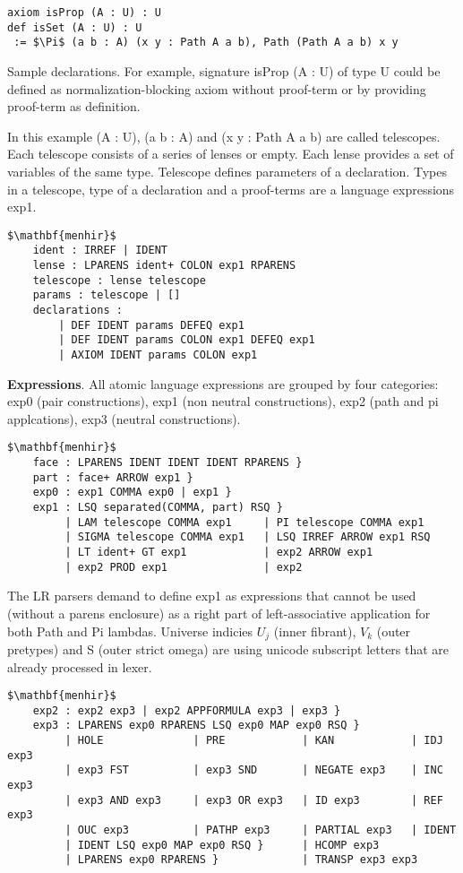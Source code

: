 \documentclass{article}
\begin{document}
\begin{lstlisting}[mathescape=true]
axiom isProp (A : U) : U
def isSet (A : U) : U
 := $\Pi$ (a b : A) (x y : Path A a b), Path (Path A a b) x y
\end{lstlisting}

Sample declarations. For example, signature isProp (A : U) of type U could be
defined as normalization-blocking axiom without proof-term or by providing proof-term as definition.

In this example (A : U), (a b : A) and (x y : Path A a b) are called telescopes.
Each telescope consists of a series of lenses or empty. Each lense provides a
set of variables of the same type. Telescope defines parameters of a declaration.
Types in a telescope, type of a declaration and a proof-terms are a language expressions exp1.

\begin{lstlisting}[mathescape=true]
$\mathbf{menhir}$
    ident : IRREF | IDENT
    lense : LPARENS ident+ COLON exp1 RPARENS
    telescope : lense telescope
    params : telescope | []
    declarations :
        | DEF IDENT params DEFEQ exp1
        | DEF IDENT params COLON exp1 DEFEQ exp1
        | AXIOM IDENT params COLON exp1
\end{lstlisting}

\textbf{Expressions}. All atomic language expressions are grouped by four categories:
exp0 (pair constructions), exp1 (non neutral constructions), exp2 (path and pi applcations),
exp3 (neutral constructions).

\begin{lstlisting}[mathescape=true]
$\mathbf{menhir}$
    face : LPARENS IDENT IDENT IDENT RPARENS }
    part : face+ ARROW exp1 }
    exp0 : exp1 COMMA exp0 | exp1 }
    exp1 : LSQ separated(COMMA, part) RSQ }
         | LAM telescope COMMA exp1     | PI telescope COMMA exp1
         | SIGMA telescope COMMA exp1   | LSQ IRREF ARROW exp1 RSQ
         | LT ident+ GT exp1            | exp2 ARROW exp1
         | exp2 PROD exp1               | exp2
\end{lstlisting}

The LR parsers demand to define exp1 as expressions that cannot be used (without a parens enclosure)
as a right part of left-associative application for both Path and Pi lambdas.
Universe indicies $U_j$ (inner fibrant), $V_k$ (outer pretypes) and S (outer strict omega)
are using unicode subscript letters that are already processed in lexer.

\begin{lstlisting}[mathescape=true]
$\mathbf{menhir}$
    exp2 : exp2 exp3 | exp2 APPFORMULA exp3 | exp3 }
    exp3 : LPARENS exp0 RPARENS LSQ exp0 MAP exp0 RSQ }
         | HOLE              | PRE            | KAN            | IDJ exp3
         | exp3 FST          | exp3 SND       | NEGATE exp3    | INC exp3
         | exp3 AND exp3     | exp3 OR exp3   | ID exp3        | REF exp3
         | OUC exp3          | PATHP exp3     | PARTIAL exp3   | IDENT
         | IDENT LSQ exp0 MAP exp0 RSQ }      | HCOMP exp3
         | LPARENS exp0 RPARENS }             | TRANSP exp3 exp3
\end{lstlisting}
\end{document}
